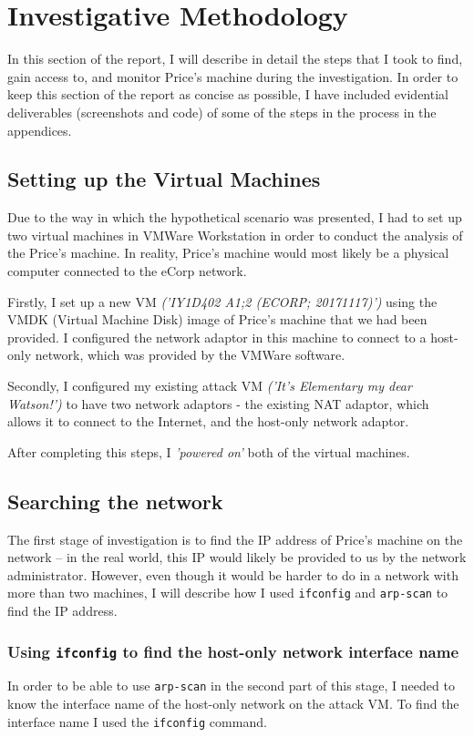\documentclass[12pt]{report}
\newcommand{\term}[1]{\colorbox{light-gray}{\texttt{#1}}}
\begin{document}
\pagebreak
\chapter{Investigative Methodology}
In this section of the report, I will describe in detail the steps that I took to find, gain access to, and monitor Price's machine during the investigation. In order to keep this section of the report as concise as possible, I have included evidential deliverables (screenshots and code) of some of the steps in the process in the appendices.


\section*{Setting up the Virtual Machines}
Due to the way in which the hypothetical scenario was presented, I had to set up two virtual machines in VMWare Workstation in order to conduct the analysis of the Price's machine. In reality, Price's machine would most likely be a physical computer connected to the eCorp network.

Firstly, I set up a new VM \textit{('IY1D402 A1;2 (ECORP; 20171117)')} using the VMDK (Virtual Machine Disk) image of Price's machine that we had been provided. I configured the network adaptor in this machine to connect to a host-only network, which was provided by the VMWare software.

Secondly, I configured my existing attack VM \textit{('It's Elementary my dear Watson!')} to have two network adaptors - the existing NAT adaptor, which allows it to connect to the Internet, and the host-only network adaptor.

After completing this steps, I \textit{'powered on'} both of the virtual machines.


\section{Searching the network}
The first stage of investigation is to find the IP address of Price's machine on the network -- in the real world, this IP would likely be provided to us by the network administrator. However, even though it would be harder to do in a network with more than two machines, I will describe how I used \texttt{ifconfig} and \texttt{arp-scan} to find the IP address.

\subsection{Using \texttt{ifconfig} to find the host-only network interface name}
In order to be able to use \texttt{arp-scan} in the second part of this stage, I needed to know the interface name of the host-only network on the attack VM. To find the interface name I used the \term{ifconfig} command.
\end{document}
